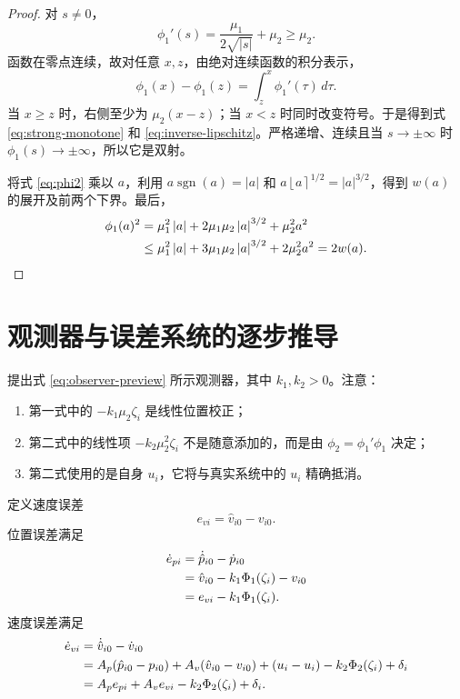 \documentclass[UTF8,a4paper,12pt]{ctexart}
\newcommand{\sgn}{\operatorname{sgn}}
\newcommand{\abs}[1]{\left\lvert #1\right\rvert}
\newcommand{\ipow}[2]{\left\lfloor #1\right\rceil^{#2}}
\begin{document}
\begin{proof}
对 $s\ne0$，
\begin{equation}
 \phi_1'(s)=\frac{\mu_1}{2\sqrt{\abs s}}+\mu_2\ge\mu_2.
\end{equation}
函数在零点连续，故对任意 $x,z$，由绝对连续函数的积分表示，
\begin{equation}
 \phi_1(x)-\phi_1(z)=\int_z^x\phi_1'(\tau)\,d\tau.
\end{equation}
当 $x\ge z$ 时，右侧至少为 $\mu_2(x-z)$；当 $x<z$ 时同时改变符号。于是得到式 \eqref{eq:strong-monotone} 和 \eqref{eq:inverse-lipschitz}。严格递增、连续且当 $s\to\pm\infty$ 时 $\phi_1(s)\to\pm\infty$，所以它是双射。

将式 \eqref{eq:phi2} 乘以 $a$，利用 $a\sgn(a)=\abs a$ 和 $a\ipow{a}{1/2}=\abs a^{3/2}$，得到 $w(a)$ 的展开及前两个下界。最后，
\begin{align}
 \phi_1(a)^2
 &=\mu_1^2\abs a+2\mu_1\mu_2\abs a^{3/2}+\mu_2^2a^2\notag\\
 &\le\mu_1^2\abs a+3\mu_1\mu_2\abs a^{3/2}+2\mu_2^2a^2
 =2w(a).
\end{align}
\end{proof}

\section{观测器与误差系统的逐步推导}

提出式 \eqref{eq:observer-preview} 所示观测器，其中 $k_1,k_2>0$。注意：
\begin{enumerate}
  \item 第一式中的 $-k_1\mu_2\zeta_i$ 是线性位置校正；
  \item 第二式中的线性项 $-k_2\mu_2^2\zeta_i$ 不是随意添加的，而是由 $\phi_2=\phi_1'\phi_1$ 决定；
  \item 第二式使用的是自身 $u_i$，它将与真实系统中的 $u_i$ 精确抵消。
\end{enumerate}

定义速度误差
\begin{equation}
 e_{vi}=\hat v_{i0}-v_{i0}.
\end{equation}
位置误差满足
\begin{align}
 \dot e_{pi}
 &=\dot{\hat p}_{i0}-\dot p_{i0}\notag\\
 &=\hat v_{i0}-k_1\Phi_1(\zeta_i)-v_{i0}\notag\\
 &=e_{vi}-k_1\Phi_1(\zeta_i).
\label{eq:ep-local}
\end{align}
速度误差满足
\begin{align}
 \dot e_{vi}
 &=\dot{\hat v}_{i0}-\dot v_{i0}\notag\\
 &=A_p(\hat p_{i0}-p_{i0})+A_v(\hat v_{i0}-v_{i0})
 +(u_i-u_i)-k_2\Phi_2(\zeta_i)+\delta_i\notag\\
 &=A_pe_{pi}+A_ve_{vi}-k_2\Phi_2(\zeta_i)+\delta_i.
\label{eq:ev-local}
\end{align}
\end{document}
